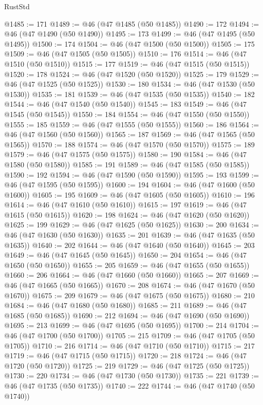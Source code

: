 \begin{lexlean}{RustStd}
\begin{coremodule}
@1485 := 171
@1489 := @46 (@47 @1485 (@50 @1485))
@1490 := 172
@1494 := @46 (@47 @1490 (@50 @1490))
@1495 := 173
@1499 := @46 (@47 @1495 (@50 @1495))
@1500 := 174
@1504 := @46 (@47 @1500 (@50 @1500))
@1505 := 175
@1509 := @46 (@47 @1505 (@50 @1505))
@1510 := 176
@1514 := @46 (@47 @1510 (@50 @1510))
@1515 := 177
@1519 := @46 (@47 @1515 (@50 @1515))
@1520 := 178
@1524 := @46 (@47 @1520 (@50 @1520))
@1525 := 179
@1529 := @46 (@47 @1525 (@50 @1525))
@1530 := 180
@1534 := @46 (@47 @1530 (@50 @1530))
@1535 := 181
@1539 := @46 (@47 @1535 (@50 @1535))
@1540 := 182
@1544 := @46 (@47 @1540 (@50 @1540))
@1545 := 183
@1549 := @46 (@47 @1545 (@50 @1545))
@1550 := 184
@1554 := @46 (@47 @1550 (@50 @1550))
@1555 := 185
@1559 := @46 (@47 @1555 (@50 @1555))
@1560 := 186
@1564 := @46 (@47 @1560 (@50 @1560))
@1565 := 187
@1569 := @46 (@47 @1565 (@50 @1565))
@1570 := 188
@1574 := @46 (@47 @1570 (@50 @1570))
@1575 := 189
@1579 := @46 (@47 @1575 (@50 @1575))
@1580 := 190
@1584 := @46 (@47 @1580 (@50 @1580))
@1585 := 191
@1589 := @46 (@47 @1585 (@50 @1585))
@1590 := 192
@1594 := @46 (@47 @1590 (@50 @1590))
@1595 := 193
@1599 := @46 (@47 @1595 (@50 @1595))
@1600 := 194
@1604 := @46 (@47 @1600 (@50 @1600))
@1605 := 195
@1609 := @46 (@47 @1605 (@50 @1605))
@1610 := 196
@1614 := @46 (@47 @1610 (@50 @1610))
@1615 := 197
@1619 := @46 (@47 @1615 (@50 @1615))
@1620 := 198
@1624 := @46 (@47 @1620 (@50 @1620))
@1625 := 199
@1629 := @46 (@47 @1625 (@50 @1625))
@1630 := 200
@1634 := @46 (@47 @1630 (@50 @1630))
@1635 := 201
@1639 := @46 (@47 @1635 (@50 @1635))
@1640 := 202
@1644 := @46 (@47 @1640 (@50 @1640))
@1645 := 203
@1649 := @46 (@47 @1645 (@50 @1645))
@1650 := 204
@1654 := @46 (@47 @1650 (@50 @1650))
@1655 := 205
@1659 := @46 (@47 @1655 (@50 @1655))
@1660 := 206
@1664 := @46 (@47 @1660 (@50 @1660))
@1665 := 207
@1669 := @46 (@47 @1665 (@50 @1665))
@1670 := 208
@1674 := @46 (@47 @1670 (@50 @1670))
@1675 := 209
@1679 := @46 (@47 @1675 (@50 @1675))
@1680 := 210
@1684 := @46 (@47 @1680 (@50 @1680))
@1685 := 211
@1689 := @46 (@47 @1685 (@50 @1685))
@1690 := 212
@1694 := @46 (@47 @1690 (@50 @1690))
@1695 := 213
@1699 := @46 (@47 @1695 (@50 @1695))
@1700 := 214
@1704 := @46 (@47 @1700 (@50 @1700))
@1705 := 215
@1709 := @46 (@47 @1705 (@50 @1705))
@1710 := 216
@1714 := @46 (@47 @1710 (@50 @1710))
@1715 := 217
@1719 := @46 (@47 @1715 (@50 @1715))
@1720 := 218
@1724 := @46 (@47 @1720 (@50 @1720))
@1725 := 219
@1729 := @46 (@47 @1725 (@50 @1725))
@1730 := 220
@1734 := @46 (@47 @1730 (@50 @1730))
@1735 := 221
@1739 := @46 (@47 @1735 (@50 @1735))
@1740 := 222
@1744 := @46 (@47 @1740 (@50 @1740))

\end{coremodule}
\end{lexlean}

